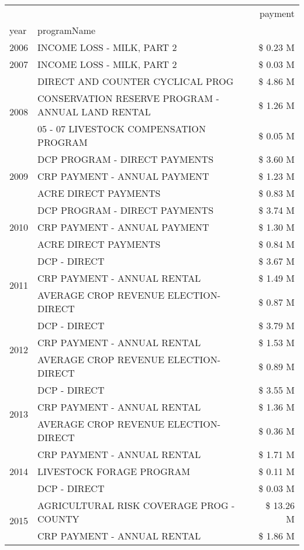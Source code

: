 \begin{tabular}{llr}
\toprule
 &  & payment \\
year & programName &  \\
\midrule
2006 & INCOME LOSS - MILK, PART 2 & \$ 0.23 M \\
\cline{1-3}
2007 & INCOME LOSS - MILK, PART 2 & \$ 0.03 M \\
\cline{1-3}
\multirow[t]{3}{*}{2008} & DIRECT AND COUNTER CYCLICAL PROG & \$ 4.86 M \\
 & CONSERVATION RESERVE PROGRAM - ANNUAL LAND RENTAL & \$ 1.26 M \\
 & 05 - 07 LIVESTOCK COMPENSATION PROGRAM & \$ 0.05 M \\
\cline{1-3}
\multirow[t]{3}{*}{2009} & DCP PROGRAM - DIRECT PAYMENTS & \$ 3.60 M \\
 & CRP PAYMENT - ANNUAL PAYMENT & \$ 1.23 M \\
 & ACRE DIRECT PAYMENTS & \$ 0.83 M \\
\cline{1-3}
\multirow[t]{3}{*}{2010} & DCP PROGRAM - DIRECT PAYMENTS & \$ 3.74 M \\
 & CRP PAYMENT - ANNUAL PAYMENT & \$ 1.30 M \\
 & ACRE DIRECT PAYMENTS & \$ 0.84 M \\
\cline{1-3}
\multirow[t]{3}{*}{2011} & DCP - DIRECT & \$ 3.67 M \\
 & CRP PAYMENT - ANNUAL RENTAL & \$ 1.49 M \\
 & AVERAGE CROP REVENUE ELECTION-DIRECT & \$ 0.87 M \\
\cline{1-3}
\multirow[t]{3}{*}{2012} & DCP - DIRECT & \$ 3.79 M \\
 & CRP PAYMENT - ANNUAL RENTAL & \$ 1.53 M \\
 & AVERAGE CROP REVENUE ELECTION-DIRECT & \$ 0.89 M \\
\cline{1-3}
\multirow[t]{3}{*}{2013} & DCP - DIRECT & \$ 3.55 M \\
 & CRP PAYMENT - ANNUAL RENTAL & \$ 1.36 M \\
 & AVERAGE CROP REVENUE ELECTION-DIRECT & \$ 0.36 M \\
\cline{1-3}
\multirow[t]{3}{*}{2014} & CRP PAYMENT - ANNUAL RENTAL & \$ 1.71 M \\
 & LIVESTOCK FORAGE PROGRAM & \$ 0.11 M \\
 & DCP - DIRECT & \$ 0.03 M \\
\cline{1-3}
\multirow[t]{3}{*}{2015} & AGRICULTURAL RISK COVERAGE PROG - COUNTY & \$ 13.26 M \\
 & CRP PAYMENT - ANNUAL RENTAL & \$ 1.86 M \\

\end{tabular}
